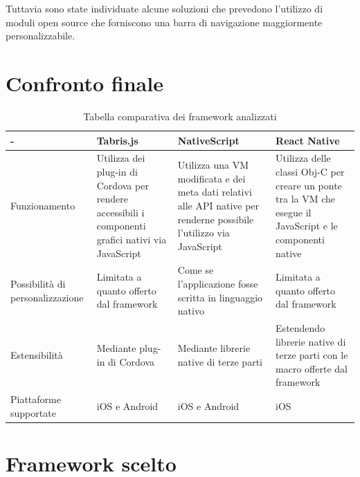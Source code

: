 Tuttavia sono state individuate alcune soluzioni che prevedono l'utilizzo di moduli open source che forniscono una barra di navigazione maggiormente personalizzabile.

\FloatBarrier
\section{Confronto finale}

\begin{table}[h]
\centering

\begin{tabular}{|m{2.3cm}|m{3cm}|m{3cm}|m{3cm}|}
\hline - & Tabris.js & NativeScript & React Native   \\ 
\hline  

Funzionamento & Utilizza dei plug-in di Cordova per rendere accessibili i componenti grafici nativi via JavaScript & Utilizza una VM modificata e dei meta dati relativi alle API native per renderne possibile l'utilizzo via JavaScript  & Utilizza delle classi Obj-C per creare un ponte tra la VM che esegue il JavaScript e le componenti native   \\ 

\hline  

 Possibilità di personalizzazione & Limitata a quanto offerto dal framework & Come se l'applicazione fosse scritta in linguaggio nativo & Limitata a quanto offerto dal framework   \\
 
\hline 

 Estensibilità & Mediante plug-in di Cordova & Mediante librerie native di terze parti & Estendendo librerie native di terze parti con le macro offerte dal framework  \\ 

\hline

 Piattaforme supportate & iOS e Android & iOS e Android & iOS   \\

\hline

\end{tabular}

\caption{Tabella comparativa dei framework analizzati}
\label{my-label}
\end{table}

\FloatBarrier
\section{Framework scelto}

